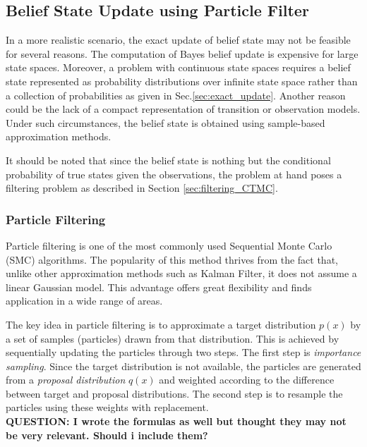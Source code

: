 \subsection{Belief State Update using Particle Filter}
\label{sec:particle_filter}
In a more realistic scenario, the exact update of belief state may not be feasible for several reasons. The computation of Bayes belief update is expensive for large state spaces. Moreover, a problem with continuous state spaces requires a belief state represented as probability distributions over infinite state space rather than a collection of probabilities as given in Sec.\ref{sec:exact_update}. \cite{Carlo1904} Another reason could be the lack of a compact representation of transition or observation models. Under such circumstances, the belief state is obtained using sample-based approximation methods. \cite{Carlo1904} 

It should be noted that since the belief state is nothing but the conditional probability of true states given the observations, the problem at hand poses a filtering problem as described in Section \ref{sec:filtering_CTMC}.

\subsubsection{Particle Filtering}
Particle filtering is one of the most commonly used Sequential Monte Carlo (SMC) algorithms. The popularity of this method thrives from the fact that, unlike other approximation methods such as Kalman Filter, it does not assume a linear Gaussian model. This advantage offers great flexibility and finds application in a wide range of areas.\cite{Doucet2009}

The key idea in particle filtering is to approximate a target distribution $ p(x) $ by a set of samples (particles) drawn from that distribution. This is achieved by sequentially updating the particles through two steps. The first step is \textit{importance sampling}. Since the target distribution is not available, the particles are generated from a \textit{proposal distribution} $ q(x) $ and weighted according to the difference between target and proposal distributions. The second step is to resample the particles using these weights with replacement. \cite{Godsill2019} \\
\textbf{QUESTION: I wrote the formulas as well but thought they may not be very relevant. Should i include them?}

